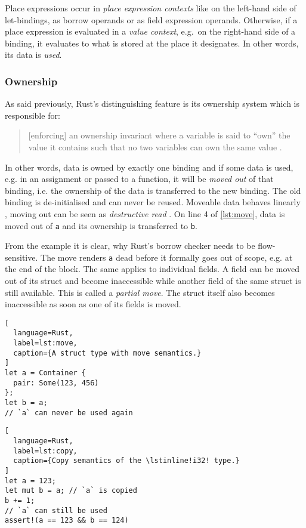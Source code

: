 Place expressions occur in \emph{place expression contexts} like on the
left-hand side of let-bindings, as borrow operands or as field expression
operands. Otherwise, if a place expression is evaluated in a \emph{value
context}, e.g.~on the right-hand side of a binding, it evaluates to what is
stored at the place it designates. In other words, its data is \emph{used}.

\subsubsection{Ownership}

As said previously, Rust's distinguishing feature is its ownership system which
is responsible for:

\begin{quote}
{[enforcing]} an ownership invariant where a
variable is said to ``own'' the value it contains such that no two variables can
own the same value \cite[page 5]{lightweight-formalism}.
\end{quote}

In other words, data is owned by exactly one binding and if some data is used,
e.g. in an assignment or passed to a function, it will be \emph{moved out} of
that binding, i.e. the ownership of the data is transferred to the new binding.
The old binding is de-initialised and can never be reused. Moveable data behaves
linearly \cite{oxide}, moving out can be seen as \emph{destructive read}
\cite{islands-alias-protection}. On line 4 of \autoref{lst:move}, data is moved
out of \lstinline!a! and its ownership is transferred to \lstinline!b!.

From the example it is clear, why Rust's borrow checker needs to be
flow-sensitive. The move renders \lstinline!a! dead before it formally
goes out of scope, e.g. at the end of the block. The same applies to individual
fields. A field can be moved out of its struct and become inaccessible while
another field of the same struct is still available. This is called a
\emph{partial move}. The struct itself also becomes inaccessible as soon as one
of its fields is moved.

\noindent\begin{minipage}[t]{.48\textwidth}
\begin{lstlisting}[
  language=Rust,
  label=lst:move,
  caption={A struct type with move semantics.}
]
let a = Container {
  pair: Some(123, 456)
};
let b = a;
// `a` can never be used again
\end{lstlisting}
\end{minipage}\hfill
\begin{minipage}[t]{.48\textwidth}
\begin{lstlisting}[
  language=Rust,
  label=lst:copy,
  caption={Copy semantics of the \lstinline!i32! type.}
]
let a = 123;
let mut b = a; // `a` is copied
b += 1;
// `a` can still be used
assert!(a == 123 && b == 124)
\end{lstlisting}
\end{minipage}

